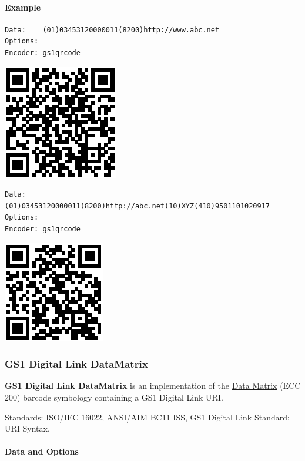 \hypertarget{example-5}{%
\paragraph{Example}\label{example-5}}

\begin{verbatim}
Data:    (01)03453120000011(8200)http://www.abc.net
Options: 
Encoder: gs1qrcode
\end{verbatim}

\includegraphics{images/gs1qrcode-1.eps}

\begin{verbatim}
Data:    (01)03453120000011(8200)http://abc.net(10)XYZ(410)9501101020917
Options: 
Encoder: gs1qrcode
\end{verbatim}

\includegraphics{images/gs1qrcode-2.eps}

\hypertarget{gs1-digital-link-datamatrix}{%
\subsubsection{GS1 Digital Link
DataMatrix}\label{gs1-digital-link-datamatrix}}

\textbf{GS1 Digital Link DataMatrix} is an implementation of the
\protect\hyperlink{data-matrix}{Data Matrix} (ECC 200) barcode symbology
containing a GS1 Digital Link URI.

Standards: ISO/IEC 16022, ANSI/AIM BC11 ISS, GS1 Digital Link Standard:
URI Syntax.

\hypertarget{data-and-options-30}{%
\paragraph{Data and Options}\label{data-and-options-30}}

